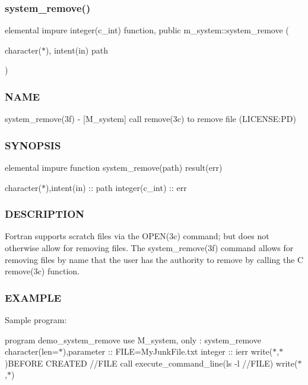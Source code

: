 \subsubsection{\texorpdfstring{system\+\_\+remove()}{system\_remove()}}
{\footnotesize\ttfamily elemental impure integer(c\+\_\+int) function, public m\+\_\+system\+::system\+\_\+remove (\begin{DoxyParamCaption}\item[{character($\ast$), intent(in)}]{path }\end{DoxyParamCaption})}



\subsubsection*{N\+A\+ME}

system\+\_\+remove(3f) -\/ \mbox{[}M\+\_\+system\mbox{]} call remove(3c) to remove file (L\+I\+C\+E\+N\+SE\+:PD) \subsubsection*{S\+Y\+N\+O\+P\+S\+IS}

elemental impure function system\+\_\+remove(path) result(err)

character($\ast$),intent(in) \+:\+: path integer(c\+\_\+int) \+:\+: err

\subsubsection*{D\+E\+S\+C\+R\+I\+P\+T\+I\+ON}

Fortran supports scratch files via the O\+P\+E\+N(3c) command; but does not otherwise allow for removing files. The system\+\_\+remove(3f) command allows for removing files by name that the user has the authority to remove by calling the C remove(3c) function.

\subsubsection*{E\+X\+A\+M\+P\+LE}

Sample program\+:

program demo\+\_\+system\+\_\+remove use M\+\_\+system, only \+: system\+\_\+remove character(len=$\ast$),parameter \+:\+: F\+I\+LE=\textquotesingle{}My\+Junk\+File.\+txt\textquotesingle{} integer \+:\+: ierr write($\ast$,$\ast$)\textquotesingle{}B\+E\+F\+O\+RE C\+R\+E\+A\+T\+ED \textquotesingle{}//\+F\+I\+LE call execute\+\_\+command\+\_\+line(\textquotesingle{}ls -\/l \textquotesingle{}//\+F\+I\+LE) write($\ast$,$\ast$)

